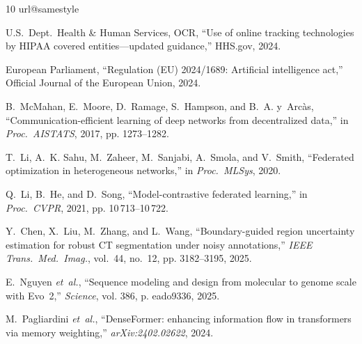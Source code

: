 \documentclass{ieeeaccess}
\begin{document}
\begin{thebibliography}{10}
\providecommand{\url}[1]{#1}
\csname url@samestyle\endcsname
\providecommand{\newblock}{\relax}
\providecommand{\bibinfo}[2]{#2}
\providecommand{\BIBentrySTDinterwordspacing}{\spaceskip=0pt\relax}
\providecommand{\BIBentryALTinterwordstretchfactor}{4}
\providecommand{\BIBentryALTinterwordspacing}{\spaceskip=\fontdimen2\font plus
\BIBentryALTinterwordstretchfactor\fontdimen3\font minus
  \fontdimen4\font\relax}
\providecommand{\BIBforeignlanguage}[2]{{%
\expandafter\ifx\csname l@#1\endcsname\relax
\typeout{** WARNING: IEEEtran.bst: No hyphenation pattern has been}%
\typeout{** loaded for the language `#1'. Using the pattern for}%
\typeout{** the default language instead.}%
\else
\language=\csname l@#1\endcsname
\fi
#2}}
\providecommand{\BIBdecl}{\relax}
\BIBdecl

{U.S.\ Dept.\ Health \& Human Services, OCR}, ``Use of online tracking
  technologies by {HIPAA} covered entities---updated guidance,'' HHS.gov, 2024.

{European Parliament}, ``Regulation ({EU}) 2024/1689: Artificial intelligence
  act,'' Official Journal of the European Union, 2024.

B.~McMahan, E.~Moore, D.~Ramage, S.~Hampson, and B.~A. y~Arc\`{a}s,
  ``Communication-efficient learning of deep networks from decentralized
  data,'' in \emph{Proc.\ AISTATS}, 2017, pp. 1273--1282.

T.~Li, A.~K. Sahu, M.~Zaheer, M.~Sanjabi, A.~Smola, and V.~Smith, ``Federated
  optimization in heterogeneous networks,'' in \emph{Proc.\ MLSys}, 2020.

Q.~Li, B.~He, and D.~Song, ``Model-contrastive federated learning,'' in
  \emph{Proc.\ CVPR}, 2021, pp. 10\,713--10\,722.

Y.~Chen, X.~Liu, M.~Zhang, and L.~Wang, ``Boundary-guided region uncertainty
  estimation for robust {CT} segmentation under noisy annotations,'' \emph{IEEE
  Trans.\ Med.\ Imag.}, vol.~44, no.~12, pp. 3182--3195, 2025.

E.~Nguyen \emph{et~al.}, ``Sequence modeling and design from molecular to
  genome scale with {Evo~2},'' \emph{Science}, vol. 386, p. eado9336, 2025.

M.~Pagliardini \emph{et~al.}, ``{DenseFormer}: enhancing information flow in
  transformers via memory weighting,'' \emph{arXiv:2402.02622}, 2024.


\end{thebibliography}
\end{document}
